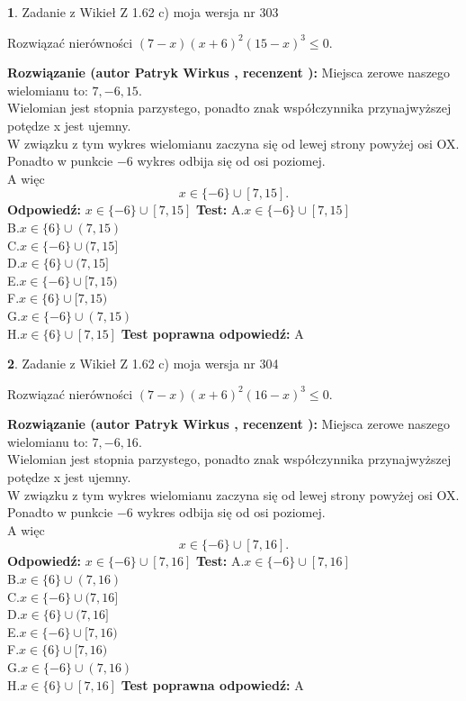 \documentclass[12pt, a4paper]{article}
\theoremstyle{definition} %
\newtheorem{zad}{}
\newcommand{\zadStart}[1]{\begin{zad}#1\newline}
\newcommand{\zadStop}{\end{zad}}
\newcommand{\rozwStart}[2]{\noindent \textbf{Rozwiązanie (autor #1 , recenzent #2): }\newline}
\newcommand{\rozwStop}{\newline}
\newcommand{\odpStart}{\noindent \textbf{Odpowiedź:}\newline}
\newcommand{\odpStop}{\newline}
\newcommand{\testStart}{\noindent \textbf{Test:}\newline}
\newcommand{\testStop}{\newline}
\newcommand{\kluczStart}{\noindent \textbf{Test poprawna odpowiedź:}\newline}
\newcommand{\kluczStop}{\newline}
\begin{document}
\zadStart{Zadanie z Wikieł Z 1.62 c) moja wersja nr 303}

Rozwiązać nierówności $(7-x)(x+6)^{2}(15-x)^{3}\le0$.
\zadStop
\rozwStart{Patryk Wirkus}{}
Miejsca zerowe naszego wielomianu to: $7, -6, 15$.\\
Wielomian jest stopnia parzystego, ponadto znak współczynnika przy\linebreak najwyższej potędze x jest ujemny.\\ W związku z tym wykres wielomianu zaczyna się od lewej strony powyżej osi OX.\\
Ponadto w punkcie $-6$ wykres odbija się od osi poziomej.\\
A więc $$x \in \{-6\} \cup [7,15].$$
\rozwStop
\odpStart
$x \in \{-6\} \cup [7,15]$
\odpStop
\testStart
A.$x \in \{-6\} \cup [7,15]$\\
B.$x \in \{6\} \cup (7,15)$\\
C.$x \in \{-6\} \cup (7,15]$\\
D.$x \in \{6\} \cup (7,15]$\\
E.$x \in \{-6\} \cup [7,15)$\\
F.$x \in \{6\} \cup [7,15)$\\
G.$x \in \{-6\} \cup (7,15)$\\
H.$x \in \{6\} \cup [7,15]$
\testStop
\kluczStart
A
\kluczStop



\zadStart{Zadanie z Wikieł Z 1.62 c) moja wersja nr 304}

Rozwiązać nierówności $(7-x)(x+6)^{2}(16-x)^{3}\le0$.
\zadStop
\rozwStart{Patryk Wirkus}{}
Miejsca zerowe naszego wielomianu to: $7, -6, 16$.\\
Wielomian jest stopnia parzystego, ponadto znak współczynnika przy\linebreak najwyższej potędze x jest ujemny.\\ W związku z tym wykres wielomianu zaczyna się od lewej strony powyżej osi OX.\\
Ponadto w punkcie $-6$ wykres odbija się od osi poziomej.\\
A więc $$x \in \{-6\} \cup [7,16].$$
\rozwStop
\odpStart
$x \in \{-6\} \cup [7,16]$
\odpStop
\testStart
A.$x \in \{-6\} \cup [7,16]$\\
B.$x \in \{6\} \cup (7,16)$\\
C.$x \in \{-6\} \cup (7,16]$\\
D.$x \in \{6\} \cup (7,16]$\\
E.$x \in \{-6\} \cup [7,16)$\\
F.$x \in \{6\} \cup [7,16)$\\
G.$x \in \{-6\} \cup (7,16)$\\
H.$x \in \{6\} \cup [7,16]$
\testStop
\kluczStart
A
\kluczStop
\end{document}
